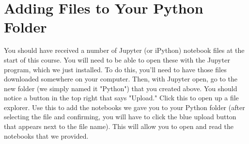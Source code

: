 \documentclass[]{article}
\begin{document}
\section*{Adding Files to Your Python Folder}
You should have received a number of Jupyter (or iPython) notebook files at the start of this course. You will need to be able to open these with the Jupyter program, which we just installed. To do this, you'll need to have those files downloaded somewhere on your computer. Then, with Jupyter open, go to the new folder (we simply named it "Python") that you created above. You should notice a button in the top right that says "Upload." Click this to open up a file explorer. Use this to add the notebooks we gave you to your Python folder (after selecting the file and confirming, you will have to click the blue upload button that appears next to the file name). This will allow you to open and read the notebooks that we provided.
\end{document}
